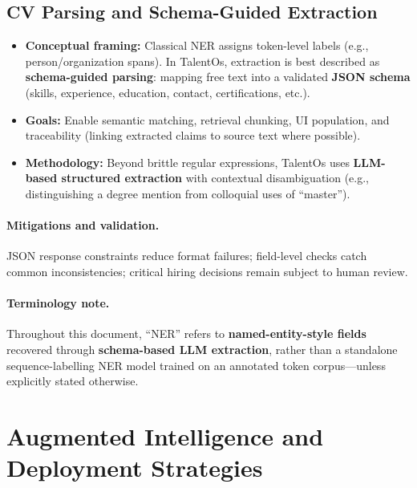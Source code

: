 \subsection{CV Parsing and Schema-Guided Extraction}
\label{sec:ch4:cv_parsing}

\begin{itemize}
    \item \textbf{Conceptual framing:} Classical NER assigns token-level labels (e.g., person/organization spans). In TalentOs, extraction is best described as \textbf{schema-guided parsing}: mapping free text into a validated \textbf{JSON schema} (skills, experience, education, contact, certifications, etc.).
    \item \textbf{Goals:} Enable semantic matching, retrieval chunking, UI population, and traceability (linking extracted claims to source text where possible).
    \item \textbf{Methodology:} Beyond brittle regular expressions, TalentOs uses \textbf{LLM-based structured extraction} with contextual disambiguation (e.g., distinguishing a degree mention from colloquial uses of ``master'').
\end{itemize}

\paragraph{Mitigations and validation.}
JSON response constraints reduce format failures; field-level checks catch common inconsistencies; critical hiring decisions remain subject to human review.

\paragraph{Terminology note.}
Throughout this document, ``NER'' refers to \textbf{named-entity-style fields} recovered through \textbf{schema-based LLM extraction}, rather than a standalone sequence-labelling NER model trained on an annotated token corpus—unless explicitly stated otherwise.

\section{Augmented Intelligence and Deployment Strategies}
\label{sec:ch4:augmented_intelligence}

